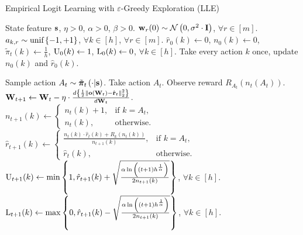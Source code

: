 \begin{algorithm}[t]
	\caption{Empirical Logit Learning with $\varepsilon$-Greedy Exploration (LLE)}
	\label{alg:logit_learning_eps_greedy_exploration}
	\begin{algorithmic}
		 State feature ${\mathbf{s}}$, $\eta > 0$, $\alpha > 0$, $\beta > 0$.
		\STATE ${\mathbf{w}}_r(0) \sim {\mathcal{N}}\left( 0, \sigma^2 \cdot {\mathbf{I}} \right)$, $\forall r \in [m]$. $a_{k, r} \sim {\text{unif}}\left\{-1, +1\right\}$, $\forall k \in [h]$, $\forall r \in [m]$.
		\STATE $\hat{r}_{0}(k) \gets 0$, $n_{0}(k) \gets 0$, $\tilde{\pi}_t(k) \gets \frac{1}{h}$, ${\text{U}}_{0}(k) \gets 1$, ${\text{L}}_{0}(k) \gets 0$, $\forall k \in [h]$.
		\STATE Take every action $k$ once, update $n_{0}(k)$ and $\hat{r}_{0}(k)$.
		
		\STATE Sample action $A_{t} \sim \tilde{{\boldsymbol{\pi}}}_t\left(\cdot \middle| {\mathbf{s}} \right)$. Take action $A_{t}$. Observe reward $R_{ A_{t}}\left(n_{t}\left(A_t\right) \right)$.
		\STATE ${\mathbf{W}}_{t+1} \leftarrow {\mathbf{W}}_t - \eta \cdot \frac{d \left\{ \frac{1}{2} \left\| {\mathbf{o}}\left( {\mathbf{W}}_t\right) - \hat{{\mathbf{r}}}_t \right\|_2^2 \right\}}{d {\mathbf{W}}_t}$.
		\STATE $n_{t+1}(k) \gets \left. 
		    \begin{cases}
		    n_{t}(k) + 1, & \text{if } k = A_t, \\
		    n_{t}(k), & \text{otherwise}.
		    \end{cases}
		    \right. \qquad$
		$\hat{r}_{t+1}(k) \gets \left. 
		    \begin{cases}
		    \frac{n_{t}(k) \cdot \hat{r}_{t}(k) + R_{k}\left(n_{t}(k)\right) }{n_{t+1}(k)}, & \text{if } k = A_t, \\
		    \hat{r}_{t}(k), & \text{otherwise}.
		    \end{cases}
		    \right.$
		\STATE ${\text{U}}_{t+1}(k) \gets
		    \min{\left\{ 1, \hat{r}_{t+1}(k) + \sqrt{\frac{\alpha \ln{\left( (t+1) h^{\frac{1}{\alpha}}\right)}}{2 n_{t+1}(k)}}\right\}}$, $\forall k \in [h]$.
		\STATE ${\text{L}}_{t+1}(k) \gets 
		    \max{\left\{ 0, \hat{r}_{t+1}(k) - \sqrt{\frac{\alpha \ln{\left( (t+1) h^{\frac{1}{\alpha}}\right)}}{2 n_{t+1}(k)}}\right\}}$, $\forall k \in [h]$.
		

\end{algorithmic}
\end{algorithm}
